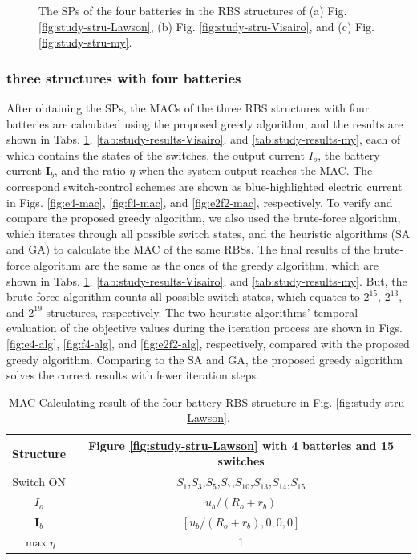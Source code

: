 \documentclass{article}
\begin{document}
\begin{figure}[htbp]
\begin{subfigure}[b]{0.31\textwidth}
        \caption{}
        \label{fig:e2f2-sp}
    \end{subfigure}
    \caption{The SPs of the four batteries in the RBS structures of (a) Fig. \ref{fig:study-stru-Lawson}, (b) Fig. \ref{fig:study-stru-Visairo}, and (c) Fig. \ref{fig:study-stru-my}.}
\end{figure}

\subsubsection{three structures with four batteries}

After obtaining the SPs, the MACs of the three RBS structures with four batteries are calculated using the proposed greedy algorithm, and the results are shown in Tabs. \ref{tab:study-results-Lawson}, \ref{tab:study-results-Visairo}, and \ref{tab:study-results-my}, each of which contains the states of the switches, the output current $I_o$, the battery current $\bm{I}_b$, and the ratio $\eta$ when the system output reaches the MAC.
The correspond switch-control schemes are shown as blue-highlighted electric current in Figs. \ref{fig:e4-mac}, \ref{fig:f4-mac}, and \ref{fig:e2f2-mac}, respectively.
To verify and compare the proposed greedy algorithm, we also used the brute-force algorithm, which iterates through all possible switch states, and the heuristic algorithms (SA and GA) to calculate the MAC of the same RBSs. 
The final results of the brute-force algorithm are the same as the ones of the greedy algorithm, which are shown in Tabs. \ref{tab:study-results-Lawson}, \ref{tab:study-results-Visairo}, and \ref{tab:study-results-my}.
But, the brute-force algorithm counts all possible switch states, which equates to $2^{15}$, $2^{13}$, and $2^{19}$ structures, respectively.
The two heuristic algorithms' temporal evaluation of the objective values during the iteration process are shown in Figs. \ref{fig:e4-alg}, \ref{fig:f4-alg}, and \ref{fig:e2f2-alg}, respectively, compared with the proposed greedy algorithm. 
Comparing to the SA and GA, the proposed greedy algorithm solves the correct results with fewer iteration steps. 

\begin{table}[htbp]
  \centering
    \caption{MAC Calculating result of the four-battery RBS structure in Fig. \ref{fig:study-stru-Lawson}.}
    \begin{tabular}{cc}
    \toprule
        Structure & Figure \ref{fig:study-stru-Lawson} with 4 batteries and 15 switches  \\
    \midrule
    Switch ON & $S_1$,$S_3$,$S_5$,$S_7$,$S_{10}$,$S_{13}$,$S_{14}$,$S_{15}$ \\
    $I_o$ & $u_b/(R_o+r_b)$ \\
    $\bm{I}_b$ & $[u_b/(R_o+r_b),0,0,0]$ \\
    $\max \eta$     & 1 \\
    \bottomrule
    \end{tabular}
  \label{tab:study-results-Lawson}
\end{table}
\end{document}
